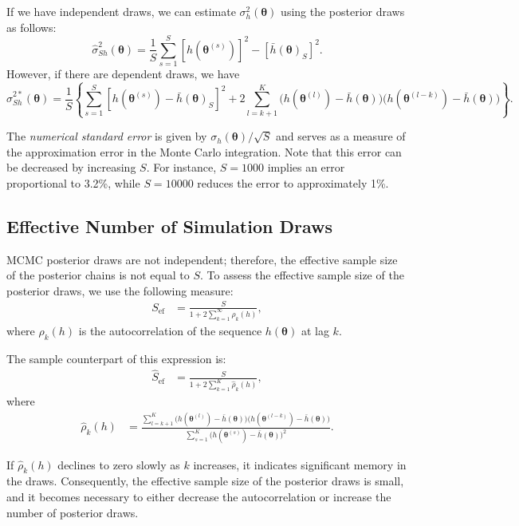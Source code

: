 If we have independent draws, we can estimate $\sigma^2_h(\bm{\theta})$ using the posterior draws as follows: 
\[
\hat{\sigma}^2_{Sh}(\bm{\theta}) = \frac{1}{S} \sum_{s=1}^S \left[h(\bm{\theta}^{(s)})\right]^2 - \left[\bar{h}(\bm{\theta})_S\right]^2.
\]
However, if there are dependent draws, we have
\[
\hat{\sigma}^{2*}_{Sh}(\bm{\theta}) = \frac{1}{S} \left\{\sum_{s=1}^S \left[h(\bm{\theta}^{(s)})-\bar{h}(\bm{\theta})_S\right]^2 + 2\sum_{l=k+1}^K \big(h(\bm{\theta}^{(l)}) - \bar{h}(\bm{\theta})\big)\big(h(\bm{\theta}^{(l-k)}) - \bar{h}(\bm{\theta})\big)\right\}.
\]

The \textit{numerical standard error} is given by $\sigma_h(\bm{\theta})/\sqrt{S}$ and serves as a measure of the approximation error in the Monte Carlo integration. Note that this error can be decreased by increasing $S$. For instance, $S = 1000$ implies an error proportional to 3.2\%, while $S = 10000$ reduces the error to approximately 1\%.
 
\subsection{Effective Number of Simulation Draws}

MCMC posterior draws are not independent; therefore, the effective sample size of the posterior chains is not equal to $S$. To assess the effective sample size of the posterior draws, we use the following measure:
\begin{align*}
	S_{\text{ef}} &= \frac{S}{1 + 2\sum_{k=1}^{\infty} \rho_k(h)},
\end{align*}
where $\rho_k(h)$ is the autocorrelation of the sequence $h(\bm{\theta})$ at lag $k$.

The sample counterpart of this expression is:
\begin{align*}
	\hat{S}_{\text{ef}} &= \frac{S}{1 + 2\sum_{k=1}^{K} \hat{\rho}_k(h)},
\end{align*}
where
\begin{align*}
	\hat{\rho}_k(h) &= \frac{\sum_{l=k+1}^K \big(h(\bm{\theta}^{(l)}) - \bar{h}(\bm{\theta})\big)\big(h(\bm{\theta}^{(l-k)}) - \bar{h}(\bm{\theta})\big)}{\sum_{s=1}^K \big(h(\bm{\theta}^{(s)}) - \bar{h}(\bm{\theta})\big)^2}.
\end{align*}

If $\hat{\rho}_k(h)$ declines to zero slowly as $k$ increases, it indicates significant memory in the draws. Consequently, the effective sample size of the posterior draws is small, and it becomes necessary to either decrease the autocorrelation or increase the number of posterior draws.

